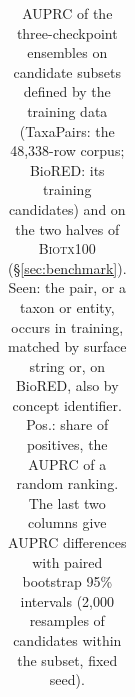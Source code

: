 \documentclass[11pt]{article}
\newcommand{\bench}{\mbox{TaxaPairs}}
\begin{document}
\begin{table}[t]
\begin{tabular}{@{}lrcccccc@{}}
\bottomrule
\end{tabular}
\caption{AUPRC of the three-checkpoint ensembles on candidate subsets defined by the training data
(\bench{}: the 48{,}338-row corpus; BioRED: its training candidates) and on the two halves of
\textsc{Biotx100} (\S\ref{sec:benchmark}). Seen: the pair, or a taxon or
entity, occurs in training, matched by surface string or, on BioRED, also by concept identifier.
Pos.: share of positives, the AUPRC of a random ranking. The last two columns give AUPRC
differences with paired bootstrap 95\% intervals (2{,}000 resamples of candidates within the
subset, fixed seed).}
\label{tab:paironly}
\end{table}

\begin{table}[t]\centering\small
\setlength{\tabcolsep}{4pt}
\caption{AUPRC of zero-shot Qwen3 models from 1.7B to 32B on the 437 \bench{} candidates (base rate
$0.574$), asked the sentence and pair questions (as in Table~\ref{tab:scaling}) or the no-passage
question. $\Delta$: pair question minus no-passage question. Last row: the trained
three-checkpoint ensembles, with the pair-only model under ``no passage''. The no-passage answers
were computed on CPUs, the other two columns on a GPU (Appendix~\ref{app:artifacts}).}
\label{tab:nopassage}
\end{table}
\end{document}
